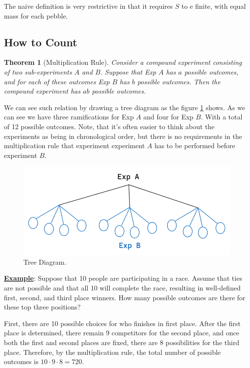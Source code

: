 \documentclass[a4paper,10pt]{article}
\newtheorem{theorem}{Theorem}
\newcommand{\hlt}[1]{\colorbox{color3}{#1}}
\begin{document}
The naive definition is very restrictive in that it requires $S$ to e finite, with equal mass for each pebble. 

\subsection{How to Count}

\begin{theorem}[Multiplication Rule]
Consider a compound experiment consisting of two sub-experiments $A$ and $B$. Suppose that Exp $A$ has \hlt{$a$} possible outcomes, and for each of these outcomes Exp $B$ has \hlt{$b$} possible outcomes. Then the compound experiment has $ab$ possible outcomes. 
\end{theorem}

We can see such relation by drawing a \hlt{tree diagram} as the figure \ref{fig:tree_diagram} shows. As we can see we have three ramifications for Exp $A$ and four for Exp $B$. With a total of 12 possible outcomes. Note, that it's often easier to think about the experiments as being in chronological order, but there is no requirements in the multiplication rule that experiment experiment $A$ has to be performed \hlt{before} experiment $B$.

\begin{figure}[ht]
\centering
\includegraphics[width=0.5\linewidth]{Figures/tree_diagram.png}
\caption{Tree Diagram.}
\label{fig:tree_diagram}
\end{figure}

\textbf{\underline{Example}}: Suppose that 10 people are participating in a race. Assume that ties are not possible and that all 10 will complete the race, resulting in well-defined first, second, and third place winners. How many possible outcomes are there for these top three positions?

First, there are 10 possible choices for who finishes in first place. After the first place is determined, there remain 9 competitors for the second place, and once both the first and second places are fixed, there are 8 possibilities for the third place. Therefore, by the multiplication rule, the \hlt{total number of possible outcomes} is $10 \cdot 9 \cdot 8 = 720$.
\end{document}

